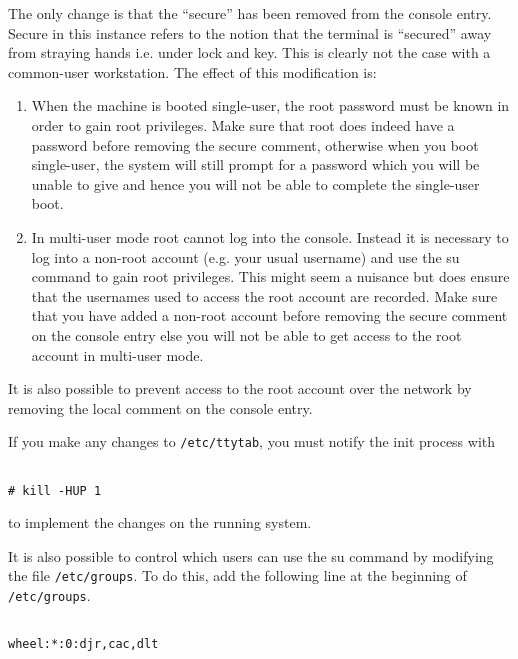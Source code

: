 The only change is that the ``secure'' has been removed from the console
entry. Secure in this instance refers to the notion that the terminal is
``secured'' away from straying hands i.e. under lock and key. This is clearly
not the case with a common-user workstation. The effect of this
modification is: 

\begin{enumerate}

\item When the machine is booted single-user, the root password must be known in
   order to gain root privileges. Make sure that root does indeed have
   a password before removing the secure comment, otherwise when you
   boot single-user, the system will still prompt for a password which
   you will be unable to give and hence you will not be able to 
   complete the single-user boot.

\item In multi-user mode root cannot log into the console. Instead it is 
   necessary to log into a non-root account (e.g. your usual username) and 
   use the su command to gain root privileges. This might seem a nuisance
   but does ensure that the usernames used to access the root account
   are recorded. Make sure that you have  added a non-root account before 
   removing the secure comment on the console entry else you will not be able to
   get access to the root account  in multi-user mode.

\end{enumerate}

It is also possible to prevent access to the root account over the network 
by removing the local comment on the console entry.

If you make any changes to {\tt /etc/ttytab}, you must notify the init process with

\begin{verbatim}

# kill -HUP 1

\end{verbatim}

to implement the changes on the running system.

It is also possible to control which users can use the su command 
by modifying the file {\tt /etc/groups}. To do this, add the following line 
at the beginning of {\tt /etc/groups}.


\begin{verbatim}

wheel:*:0:djr,cac,dlt

\end{verbatim}


